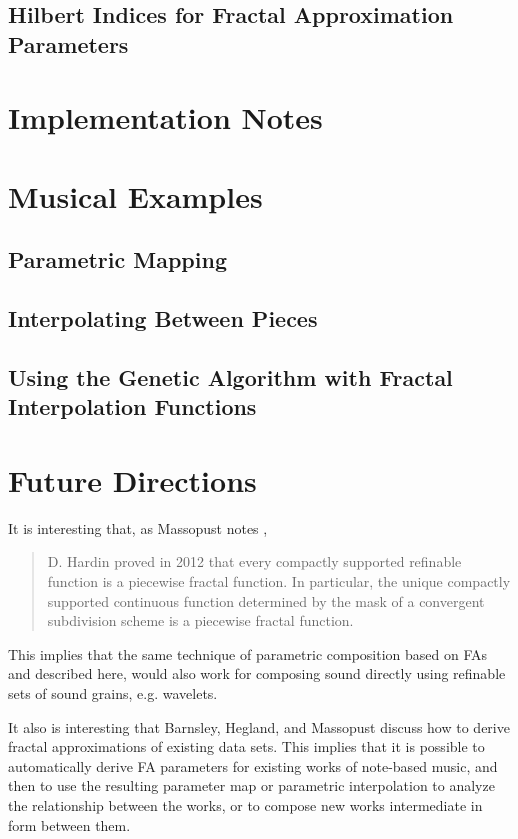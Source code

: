 \documentclass[english,11pt,letterpaper,onecolumn]{scrartcl}
\begin{document}
\subsection{Hilbert Indices for Fractal Approximation Parameters}

\section{Implementation Notes}

\section{Musical Examples}

\subsection{Parametric Mapping}


\subsection{Interpolating Between Pieces}


\subsection{Using the Genetic Algorithm with Fractal Interpolation Functions}

\section{Future Directions}

It is interesting that, as Massopust notes \cite{massopust2017}, 
\begin{quote}D. Hardin proved in 2012 that every compactly supported 
refinable function is a piecewise fractal function. In particular, the unique 
compactly supported continuous function determined by the mask of a convergent 
subdivision scheme is a piecewise fractal function. \end{quote} 
This implies that the same technique of parametric 
composition based on FAs and described here, would also work for composing 
sound directly using refinable sets of sound grains, e.g. wavelets.

It also is interesting that Barnsley, Hegland, and Massopust 
\cite{2013arXiv1309.0972B} discuss how to derive fractal approximations of 
existing data sets. This implies that it is possible to automatically derive 
FA parameters for existing works of note-based music, and then to use the 
resulting parameter map or parametric interpolation to analyze the 
relationship between the works, or to compose new works intermediate in form 
between them.

% 
%
\printbibliography
\end{document}
